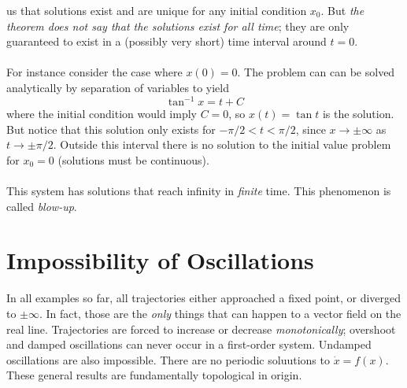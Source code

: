 \documentclass{report}
\theoremstyle{definition}
\begin{document}
us that solutions exist and are unique for any initial condition $x_0$. 
But \textit{the theorem does not say that the solutions exist for all time}; they are only guaranteed to exist in a (possibly very short) time interval around $t=0$.\\
\vspace{1mm}\\
For instance consider the case where $x(0)=0$. The problem can can be solved analytically by separation of variables to yield
\begin{equation*}
\tan^{-1}x=t+C
\end{equation*}
where the initial condition would imply $C=0$, so $x(t)=\tan t$ is the solution. But notice that this solution only exists for $-\pi/2<t<\pi/2$, since $x\to\pm\infty$ as $t\to\pm\pi/2$. 
Outside this interval there is no solution to the initial value problem for $x_0=0$ (solutions must be continuous).\\
\vspace{1mm}\\
This system has solutions that reach infinity in \textit{finite} time. This phenomenon is called \textit{blow-up}.

\section{Impossibility of Oscillations}
In all examples so far, all trajectories either approached a fixed point, or diverged to $\pm\infty$. In fact, those are the \textit{only} things that can happen to a vector field on the real line.
Trajectories are forced to increase or decrease \textit{monotonically}; overshoot and damped oscillations can never occur in a first-order system. Undamped oscillations are also impossible.
There are no periodic soluutions to $\dot x=f(x)$. These general results are fundamentally topological in origin. 
\newpage
\end{document}
